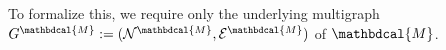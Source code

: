 \documentclass[letterpaper]{article} %
\theoremstyle{plain}
\theoremstyle{definition}
\theoremstyle{remark}
\newcommand{\todo}[1]{{\color{red}\ \!\Large\smash{\textbf{[}}{\normalsize\textsc{todo:} #1}\ \!\smash{\textbf{]}}}}
\newcommand{\N}{\mathcal N}
\newcommand{\Ed}{\mathcal E}
\newcommand{\dg}[1]{\mathbdcal{#1}}
\begin{document}
To formalize this, we require only the underlying multigraph $G^{\dg M} :=
(\N^{\dg M}, \Ed^{\dg M})$ of $\dg M$. 
\end{document}

